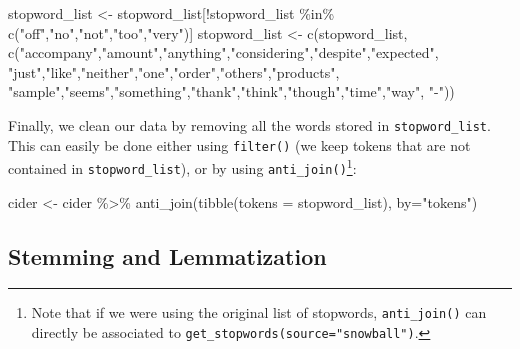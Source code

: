 \documentclass[
]{book}
\newenvironment{Shaded}{\begin{snugshade}}{\end{snugshade}}
\newcommand{\AttributeTok}[1]{\textcolor[rgb]{0.77,0.63,0.00}{#1}}
\newcommand{\FunctionTok}[1]{\textcolor[rgb]{0.00,0.00,0.00}{#1}}
\newcommand{\NormalTok}[1]{#1}
\newcommand{\OtherTok}[1]{\textcolor[rgb]{0.56,0.35,0.01}{#1}}
\newcommand{\SpecialCharTok}[1]{\textcolor[rgb]{0.00,0.00,0.00}{#1}}
\newcommand{\StringTok}[1]{\textcolor[rgb]{0.31,0.60,0.02}{#1}}
\begin{document}
\begin{Shaded}
\begin{Highlighting}[]
\NormalTok{stopword\_list }\OtherTok{\textless{}{-}}\NormalTok{ stopword\_list[}\SpecialCharTok{!}\NormalTok{stopword\_list }\SpecialCharTok{\%in\%} \FunctionTok{c}\NormalTok{(}\StringTok{"off"}\NormalTok{,}\StringTok{"no"}\NormalTok{,}\StringTok{"not"}\NormalTok{,}\StringTok{"too"}\NormalTok{,}\StringTok{"very"}\NormalTok{)]}
\NormalTok{stopword\_list }\OtherTok{\textless{}{-}} \FunctionTok{c}\NormalTok{(stopword\_list, }\FunctionTok{c}\NormalTok{(}\StringTok{"accompany"}\NormalTok{,}\StringTok{"amount"}\NormalTok{,}\StringTok{"anything"}\NormalTok{,}\StringTok{"considering"}\NormalTok{,}\StringTok{"despite"}\NormalTok{,}\StringTok{"expected"}\NormalTok{,}
                                    \StringTok{"just"}\NormalTok{,}\StringTok{"like"}\NormalTok{,}\StringTok{"neither"}\NormalTok{,}\StringTok{"one"}\NormalTok{,}\StringTok{"order"}\NormalTok{,}\StringTok{"others"}\NormalTok{,}\StringTok{"products"}\NormalTok{,}
                                    \StringTok{"sample"}\NormalTok{,}\StringTok{"seems"}\NormalTok{,}\StringTok{"something"}\NormalTok{,}\StringTok{"thank"}\NormalTok{,}\StringTok{"think"}\NormalTok{,}\StringTok{"though"}\NormalTok{,}\StringTok{"time"}\NormalTok{,}\StringTok{"way"}\NormalTok{,}
                                    \StringTok{"{-}"}\NormalTok{))}
\end{Highlighting}
\end{Shaded}

Finally, we clean our data by removing all the words stored in \texttt{stopword\_list}. This can easily be done either using \texttt{filter()} (we keep tokens that are not contained in \texttt{stopword\_list}), or by using \texttt{anti\_join()}\footnote{Note that if we were using the original list of stopwords, \texttt{anti\_join()} can directly be associated to \texttt{get\_stopwords(source="snowball")}.}:

\begin{Shaded}
\begin{Highlighting}[]
\NormalTok{cider }\OtherTok{\textless{}{-}}\NormalTok{ cider }\SpecialCharTok{\%\textgreater{}\%} 
  \FunctionTok{anti\_join}\NormalTok{(}\FunctionTok{tibble}\NormalTok{(}\AttributeTok{tokens =}\NormalTok{ stopword\_list), }\AttributeTok{by=}\StringTok{"tokens"}\NormalTok{)}
\end{Highlighting}
\end{Shaded}

\hypertarget{stemming-and-lemmatization}{%
\subsection{Stemming and Lemmatization}\label{stemming-and-lemmatization}}
\end{document}
